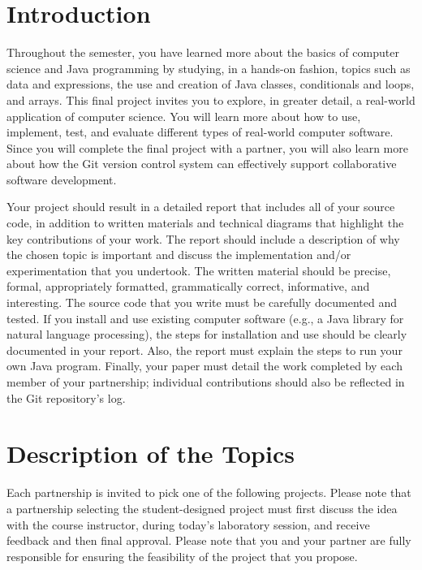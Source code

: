 

\usepackage[compact]{titlesec}


\vspace*{-.2in}

\section*{Introduction}

Throughout the semester, you have learned more about the basics of computer science and Java programming by studying, in
a hands-on fashion, topics such as data and expressions, the use and creation of Java classes, conditionals and loops,
and arrays.  This final project invites you to explore, in greater detail, a real-world application of computer science.
You will learn more about how to use, implement, test, and evaluate different types of real-world computer software.
Since you will complete the final project with a partner, you will also learn more about how the Git version control
system can effectively support collaborative software development.

Your project should result in a detailed report that includes all of your source code, in addition to written materials
and technical diagrams that highlight the key contributions of your work.  The report should include a description of
why the chosen topic is important and discuss the implementation and/or experimentation that you undertook.  The written
material should be precise, formal, appropriately formatted, grammatically correct, informative, and interesting.  The
source code that you write must be carefully documented and tested.  If you install and use existing computer software
(e.g., a Java library for natural language processing),  the steps for installation and use should be clearly documented
in your report. Also, the report must explain the steps to run your own Java program.  Finally, your paper must detail
the work completed by each member of your partnership; individual contributions should also be reflected in the Git
repository's log.

\section*{Description of the Topics}

Each partnership is invited to pick one of the following projects.  Please note that a partnership selecting the
student-designed project must first discuss the idea with the course instructor, during today's laboratory session, and
receive feedback and then final approval.  Please note that you and your partner are fully responsible for ensuring the
feasibility of the project that you propose.

